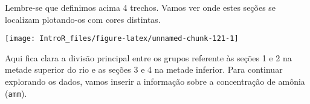 \documentclass[
]{book}
\newenvironment{Shaded}{\begin{snugshade}}{\end{snugshade}}
\newcommand{\AttributeTok}[1]{\textcolor[rgb]{0.77,0.63,0.00}{#1}}
\newcommand{\DecValTok}[1]{\textcolor[rgb]{0.00,0.00,0.81}{#1}}
\newcommand{\FunctionTok}[1]{\textcolor[rgb]{0.00,0.00,0.00}{#1}}
\newcommand{\NormalTok}[1]{#1}
\newcommand{\OtherTok}[1]{\textcolor[rgb]{0.56,0.35,0.01}{#1}}
\newcommand{\SpecialCharTok}[1]{\textcolor[rgb]{0.00,0.00,0.00}{#1}}
\newcommand{\StringTok}[1]{\textcolor[rgb]{0.31,0.60,0.02}{#1}}
\begin{document}
Lembre-se que definimos acima 4 trechos. Vamos ver onde estes seções se localizam plotando-os com cores distintas.

\begin{Shaded}
\end{Shaded}

\begin{center}\texttt{[image: IntroR\_files/figure-latex/unnamed-chunk-121-1]} \end{center}

Aqui fica clara a divisão principal entre os grupos referente às seções 1 e 2 na metade superior do rio e as seções 3 e 4 na metade inferior. Para continuar explorando os dados, vamos inserir a informação sobre a concentração de amônia (\texttt{amm}).
\end{document}
